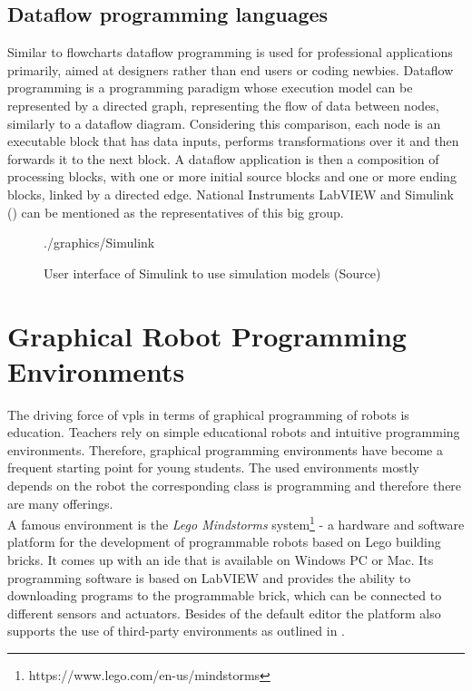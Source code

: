 \subsection{Dataflow programming languages}
Similar to flowcharts dataflow programming is used for professional applications primarily, aimed at designers rather than end users or coding newbies. Dataflow programming is a programming paradigm whose execution model can be represented by a directed graph, representing the flow of data between nodes, similarly to a dataflow diagram. Considering this comparison, each node is an executable block that has data inputs, performs transformations over it and then forwards it to the next block. A dataflow application is then a composition of processing blocks, with one or more initial source blocks and one or more ending blocks, linked by a directed edge.\cite{Sousa2012DataflowPC} National Instruments LabVIEW \cite{LabView} and Simulink () can be mentioned as the representatives of this big group.

\begin{figure}[!htpb]
	\centering
	\begin{overpic}[width=0.65\linewidth]{./graphics/Simulink}
	\end{overpic}
    \caption[User interface of Simulink to use simulation models]%
    {User interface of Simulink to use simulation models (Source\footnotemark)}
	\label{fig:Simulink}%
\end{figure}

\section{Graphical Robot Programming Environments} \label{sec:GraphicalEnvs}
The driving force of \glspl{vpl} in terms of graphical programming of robots is education. Teachers rely on simple educational robots and intuitive programming environments. Therefore, graphical programming environments have become a frequent starting point for young students. The used environments mostly depends on the robot the corresponding class is programming and therefore there are many offerings. \\

A famous environment is the \textit{Lego Mindstorms} system\footnote{https://www.lego.com/en-us/mindstorms} - a hardware and software platform for the development of programmable robots based on Lego building bricks. It comes up with an \gls{ide} that is available on Windows PC or Mac. Its programming software is based on LabVIEW and provides the ability to downloading programs to the programmable brick, which can be connected to different sensors and actuators. Besides of the default editor the platform also supports the use of third-party environments as outlined in \cite{Hirst2003}. \\

